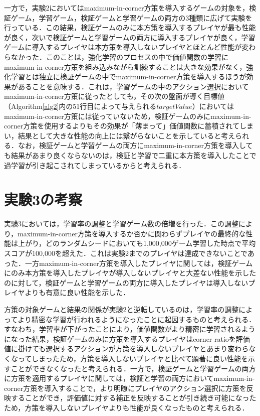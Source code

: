\documentclass{suribt}
\begin{document}
一方で，実験2においてはmaximum-in-corner方策を導入するゲームの対象を，検証ゲーム，学習ゲーム，検証ゲームと学習ゲームの両方の3種類に広げて実験を行っている．この結果，検証ゲームのみに本方策を導入するプレイヤが最も性能が良く，次いで検証ゲームと学習ゲームの両方に導入するプレイヤが良く，学習ゲームに導入するプレイヤは本方策を導入しないプレイヤとほとんど性能が変わらなかった．このことは，強化学習のプロセスの中で価値関数の学習にmaximum-in-corner方策を組み込みながら訓練することは大きな効果がなく，強化学習とは独立に検証ゲームの中でmaximum-in-corner方策を導入するほうが効果があることを意味する．これは，学習ゲームの中のアクション選択においてmaximum-in-corner方策に従ったとしても，その次の盤面が導く目標値（Algorithm\ref{alg2}内の51行目によって与えられる$targetValue$）においてはmaximum-in-corner方策には従っていないため，検証ゲームのみにmaximum-in-corner方策を使用するよりもその効果が「薄まって」価値関数に蓄積されてしまい，結果として大きな性能の向上には繋がらないことを示していると考えられる．なお，検証ゲームと学習ゲームの両方にmaximum-in-corner方策を導入しても結果があまり良くならないのは，検証と学習で二重に本方策を導入したことで過学習が引き起こされてしまっているからと考えられる．

\section{実験3の考察}
実験3においては，学習率の調整と学習ゲーム数の倍増を行った．この調整により，maximum-in-corner方策を導入するか否かに関わらずプレイヤの最終的な性能は上がり，どのランダムシードにおいても1,000,000ゲーム学習した時点で平均スコアが100,000を超えた．これは実験2までのプレイヤは達成できないことであった．一方maximum-in-corner方策を導入したプレイヤに関しては，検証ゲームにのみ本方策を導入したプレイヤが導入しないプレイヤと大差ない性能を示したのに対して，検証ゲームと学習ゲームの両方に導入したプレイヤは導入しないプレイヤよりも有意に良い性能を示した．

方策の対象ゲームと結果の関係が実験2と逆転しているのは，学習率の調整によってより精密な学習が行われるようになったことに起因するものと考えられる．すなわち，学習率が下がったことにより，価値関数がより精密に学習されるようになった結果，検証ゲームのみに方策を導入するプレイヤはcorner ratioを評価値に掛けても選択するアクションが方策を導入しないプレイヤとあまり変わらなくなってしまったため，方策を導入しないプレイヤと比べて顕著に良い性能を示すことができなくなったと考えられる．一方で，検証ゲームと学習ゲームの両方に方策を適用するプレイヤに関しては，検証と学習の両方においてmaximum-in-corner方策を導入することで，より明瞭にプレイヤのアクション選択に方策を反映することができ，評価値に対する補正を反映することが引き続き可能になったため，方策を導入しないプレイヤよりも性能が良くなったものと考えられる．
\end{document}
